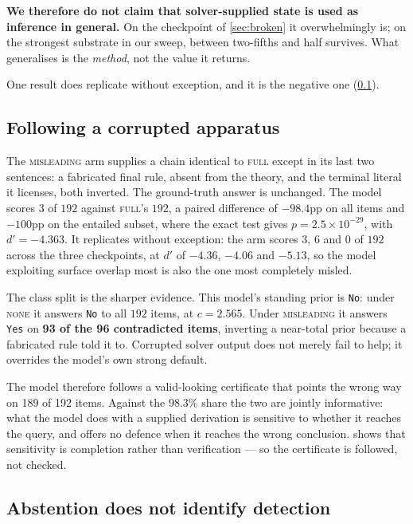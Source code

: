 \documentclass[10pt,twocolumn]{article}
\begin{document}
\textbf{We therefore do not claim that solver-supplied state is used as inference
in general.} On the checkpoint of \cref{sec:broken} it overwhelmingly is; on the strongest substrate in our sweep, between two-fifths and half survives. What generalises is the \emph{method}, not the value it returns.

One result does replicate without exception, and it is the negative one
(\cref{sec:corruption}).

\subsection{Following a corrupted apparatus}
\label{sec:corruption}

The \textsc{misleading} arm supplies a chain identical to \textsc{full} except in
its last two sentences: a fabricated final rule, absent from the theory, and the
terminal literal it licenses, both inverted. The ground-truth answer is unchanged. The model scores $3$ of $192$ against \textsc{full}'s $192$, a paired difference
of $-98.4$pp on all items and $-100$pp on the entailed subset, where the exact
test gives $p = 2.5\times10^{-29}$, with $d' = -4.363$. It replicates without exception: the arm scores $3$, $6$ and
$0$ of $192$ across the three checkpoints, at $d'$ of $-4.36$, $-4.06$ and
$-5.13$, so the model exploiting surface overlap most is also the one most
completely misled.

The class split is the sharper evidence. This model's standing prior is \texttt{No}: under \textsc{none} it answers
\texttt{No} to all $192$ items, at $c = 2.565$. Under
\textsc{misleading} it answers \texttt{Yes} on \textbf{93 of the 96 contradicted
items}, inverting a near-total prior because a fabricated rule told it to.
Corrupted solver output does not merely fail to help; it overrides the model's
own strong default.

The model therefore follows a valid-looking certificate that points the wrong
way on 189 of 192 items. Against the $98.3\%$ share the two are jointly informative: what the model does
with a supplied derivation is sensitive to whether it reaches the query, and
offers no defence when it reaches the wrong conclusion.
 shows that sensitivity is completion rather than
verification --- so the certificate is followed, not checked.

\subsection{Abstention does not identify detection}
\label{sec:detection}
\end{document}
